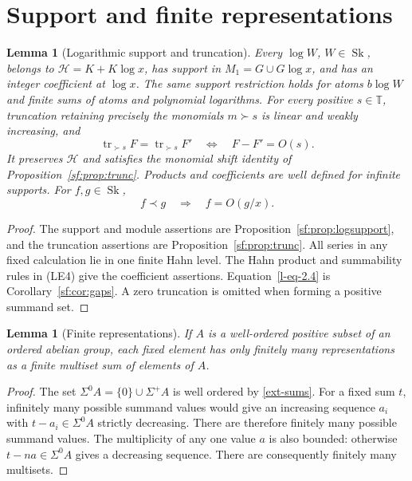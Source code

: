 \documentclass[11pt]{article}
\newtheorem{lemma}[theorem]{Lemma}
\theoremstyle{definition}
\theoremstyle{remark}
\newcommand{\Sk}{\operatorname{Sk}}
\newcommand{\T}{\mathbb T}
\newcommand{\tr}{\operatorname{tr}}
\numberwithin{equation}{section}
\begin{document}
\section{Support and finite representations}

\begin{lemma}[Logarithmic support and truncation]\label{support-expanded}
Every $\log W$, $W\in\Sk$, belongs to
$\mathcal H=K+K\log x$, has support in $M_1=G\cup G\log x$,
and has an integer coefficient at $\log x$. The same support
restriction holds for atoms $b\log W$ and finite sums of atoms
and polynomial logarithms.
For every positive $s\in\T$, truncation retaining precisely the
monomials $m\succ s$ is linear and weakly increasing, and
\[
 \tr_{\succ s}F=\tr_{\succ s}F'
       \quad\Longleftrightarrow\quad F-F'=O(s).
\]
It preserves $\mathcal H$ and satisfies the monomial shift
identity of Proposition~\ref{sf:prop:trunc}. Products and coefficients
are well defined for infinite supports. For $f,g\in\Sk$,
\begin{equation}
 f\prec g\quad\Longrightarrow\quad f=O(g/x).
 \label{l-eq-2.4}
\end{equation}
\end{lemma}
\begin{proof}
The support and module assertions are
Proposition~\ref{sf:prop:logsupport}, and the truncation assertions
are Proposition~\ref{sf:prop:trunc}. All series in any fixed
calculation lie in one finite Hahn level. The Hahn product and
summability rules in (LE4) give the coefficient assertions.
Equation~\eqref{l-eq-2.4} is Corollary~\ref{sf:cor:gaps}.
A zero truncation is omitted when forming a positive summand set.
\end{proof}

\begin{lemma}[Finite representations]\label{l-lem:representations}
If $A$ is a well-ordered positive subset of an ordered abelian group,
each fixed element has only finitely many representations as a
finite multiset sum of elements of $A$.
\end{lemma}
\begin{proof}
The set $\Sigma^0 A=\{0\}\cup\Sigma^+A$ is well ordered by \eqref{ext-sums}.
For a fixed sum $t$, infinitely many possible summand values would
give an increasing sequence $a_i$ with
$t-a_i\in\Sigma^0A$ strictly decreasing.  There are therefore finitely
many possible summand values.  The multiplicity of any one value $a$
is also bounded: otherwise $t-na\in\Sigma^0A$ gives a decreasing
sequence.  There are consequently finitely many multisets.
\end{proof}
\end{document}
